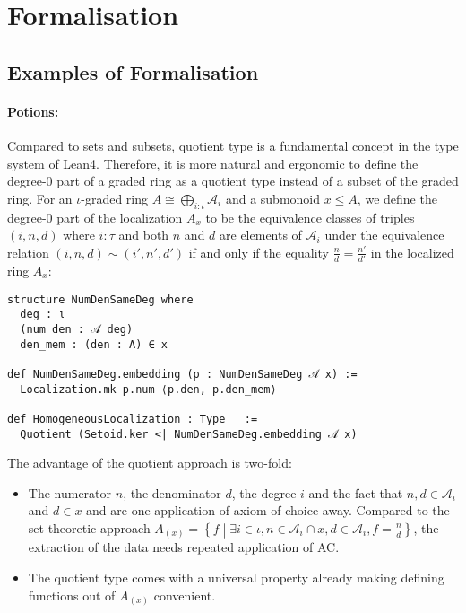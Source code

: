 \documentclass[graybox]{svmult}
\begin{document}
\section{Formalisation}



\subsection{Examples of Formalisation} 

\paragraph{Potions:}%
Compared to sets and subsets, quotient type is a fundamental concept in the type system of Lean4. 
Therefore, it is more natural and ergonomic to define the degree-$0$ part of a graded ring as a quotient type 
instead of a subset of the graded ring. For an $\iota$-graded ring $A \cong \bigoplus_{i : \iota} \mathcal{A}_i$ and a submonoid $x \le A$, 
we define the degree-$0$ part of the localization $A_x$ to be the equivalence classes of triples $(i, n, d)$ where 
$i : \tau$ and both $n$ and $d$ are elements of $\mathcal{A}_i$ under the equivalence relation 
$(i, n, d) \sim (i', n', d')$ if and only if the equality $\frac{n}{d} = \frac{n'}{d'}$ in the localized ring $A_x$:
\begin{lstlisting}
structure NumDenSameDeg where
  deg : ι
  (num den : 𝒜 deg)
  den_mem : (den : A) ∈ x

def NumDenSameDeg.embedding (p : NumDenSameDeg 𝒜 x) :=
  Localization.mk p.num ⟨p.den, p.den_mem⟩

def HomogeneousLocalization : Type _ :=
  Quotient (Setoid.ker <| NumDenSameDeg.embedding 𝒜 x)
\end{lstlisting}
The advantage of the quotient approach is two-fold:
\begin{itemize}
  \item The numerator $n$, the denominator $d$, the degree $i$ and the fact that $n, d \in \mathcal{A}_i$ and $d \in x$ and  are one application of axiom of choice away.
  Compared to the set-theoretic approach $A_{(x)} = \left\{f\middle|\exists i \in \iota, n \in \mathcal{A}_i \cap x, d \in \mathcal{A}_i, f = \frac{n}{d}\right\}$, the extraction of the data needs repeated application of AC.
  \item The quotient type comes with a universal property already making defining functions out of $A_{(x)}$ convenient.
\end{itemize}
\end{document}
